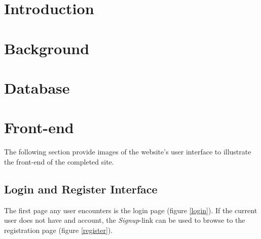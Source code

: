 \documentclass[a4paper,12pt]{article}
\numberwithin{equation}{section} %
\numberwithin{figure}{section}
\begin{document}
\section{Introduction}



\section{Background}

\section{Database}

\section{Front-end}
The following section provide images of the website's user interface to illustrate the front-end of the completed site.
\subsection{Login and Register Interface}
The first page any user encounters is the login page (figure \ref{login}). If the current user does not have and account, the \textit{Signup}-link can be used to browse to the registration page (figure \ref{register}).

\newcommand{\picScale}{0.55}
\newcommand{\minipageWidth}{0.46\textwidth}
\end{document}
